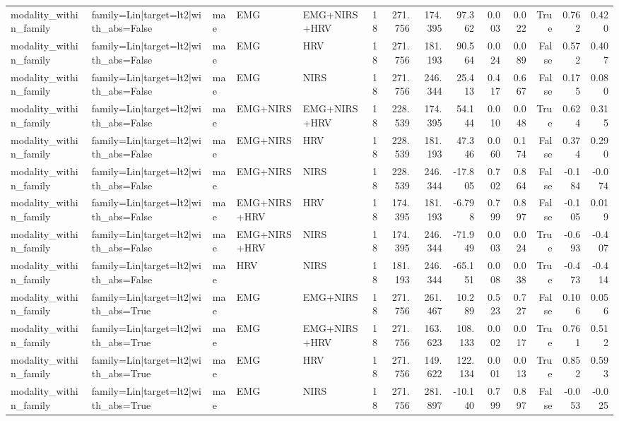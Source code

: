 \begin{table}
\begin{tabular}{lllllrrrrrrrrr}
modality_within_family & family=Lin|target=lt2|with_abs=False & mae & EMG & EMG+NIRS+HRV & 18 & 271.756 & 174.395 & 97.362 & 0.003 & 0.022 & True & 0.762 & 0.420 \\
modality_within_family & family=Lin|target=lt2|with_abs=False & mae & EMG & HRV & 18 & 271.756 & 181.193 & 90.564 & 0.024 & 0.089 & False & 0.572 & 0.407 \\
modality_within_family & family=Lin|target=lt2|with_abs=False & mae & EMG & NIRS & 18 & 271.756 & 246.344 & 25.413 & 0.417 & 0.667 & False & 0.175 & 0.080 \\
modality_within_family & family=Lin|target=lt2|with_abs=False & mae & EMG+NIRS & EMG+NIRS+HRV & 18 & 228.539 & 174.395 & 54.144 & 0.010 & 0.048 & True & 0.624 & 0.315 \\
modality_within_family & family=Lin|target=lt2|with_abs=False & mae & EMG+NIRS & HRV & 18 & 228.539 & 181.193 & 47.346 & 0.060 & 0.174 & False & 0.374 & 0.290 \\
modality_within_family & family=Lin|target=lt2|with_abs=False & mae & EMG+NIRS & NIRS & 18 & 228.539 & 246.344 & -17.805 & 0.702 & 0.864 & False & -0.184 & -0.074 \\
modality_within_family & family=Lin|target=lt2|with_abs=False & mae & EMG+NIRS+HRV & HRV & 18 & 174.395 & 181.193 & -6.798 & 0.799 & 0.897 & False & -0.105 & 0.019 \\
modality_within_family & family=Lin|target=lt2|with_abs=False & mae & EMG+NIRS+HRV & NIRS & 18 & 174.395 & 246.344 & -71.949 & 0.003 & 0.024 & True & -0.693 & -0.407 \\
modality_within_family & family=Lin|target=lt2|with_abs=False & mae & HRV & NIRS & 18 & 181.193 & 246.344 & -65.151 & 0.008 & 0.038 & True & -0.473 & -0.414 \\
modality_within_family & family=Lin|target=lt2|with_abs=True & mae & EMG & EMG+NIRS & 18 & 271.756 & 261.467 & 10.289 & 0.523 & 0.727 & False & 0.106 & 0.056 \\
modality_within_family & family=Lin|target=lt2|with_abs=True & mae & EMG & EMG+NIRS+HRV & 18 & 271.756 & 163.623 & 108.133 & 0.002 & 0.017 & True & 0.761 & 0.512 \\
modality_within_family & family=Lin|target=lt2|with_abs=True & mae & EMG & HRV & 18 & 271.756 & 149.622 & 122.134 & 0.001 & 0.013 & True & 0.852 & 0.593 \\
modality_within_family & family=Lin|target=lt2|with_abs=True & mae & EMG & NIRS & 18 & 271.756 & 281.897 & -10.140 & 0.799 & 0.897 & False & -0.053 & -0.025 \\

\end{tabular}
\end{table}
